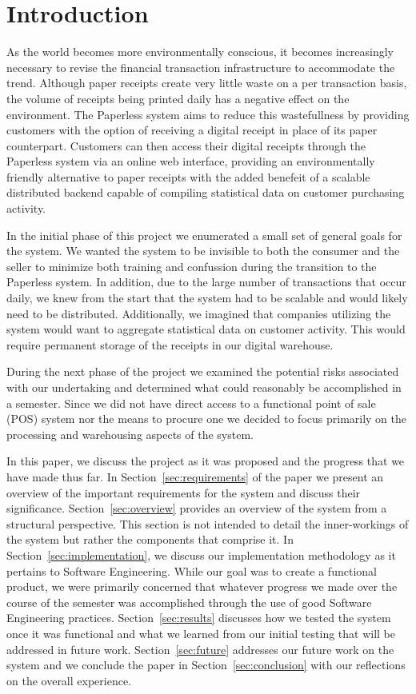 \section{Introduction}
As the world becomes more environmentally conscious, it becomes
increasingly necessary to revise the financial transaction
infrastructure to accommodate the trend.  Although paper receipts
create very little waste on a per transaction basis, the volume of
receipts being printed daily has a negative effect on the environment.
The Paperless system aims to reduce this wastefullness by providing
customers with the option of receiving a digital receipt in place of
its paper counterpart.  Customers can then access their digital
receipts through the Paperless system via an online web interface,
providing an environmentally friendly alternative to paper receipts
with the added benefeit of a scalable distributed backend capable of
compiling statistical data on customer purchasing activity.

In the initial phase of this project we enumerated a small set of
general goals for the system.  We wanted the system to be invisible to
both the consumer and the seller to minimize both training and
confussion during the transition to the Paperless system.  In
addition, due to the large number of transactions that occur daily, we
knew from the start that the system had to be scalable and would
likely need to be distributed.  Additionally, we imagined that
companies utilizing the system would want to aggregate statistical
data on customer activity.  This would require permanent storage of
the receipts in our digital warehouse.

During the next phase of the project we examined the potential risks
associated with our undertaking and determined what could reasonably
be accomplished in a semester.  Since we did not have direct access to
a functional point of sale (POS) system nor the means to procure one
we decided to focus primarily on the processing and warehousing
aspects of the system. 

In this paper, we discuss the project as it was proposed and the
progress that we have made thus far.  In
Section~\ref{sec:requirements} of the paper we present an overview of
the important requirements for the system and discuss their
significance.  Section~\ref{sec:overview} provides an overview of the
system from a structural perspective.  This section is not intended to
detail the inner-workings of the system but rather the components that
comprise it.  In Section~\ref{sec:implementation}, we discuss our
implementation methodology as it pertains to Software Engineering.
While our goal was to create a functional product, we were primarily
concerned that whatever progress we made over the course of the
semester was accomplished through the use of good Software Engineering
practices. Section~\ref{sec:results} discusses how we tested the
system once it was functional and what we learned from our initial
testing that will be addressed in future
work. Section~\ref{sec:future} addresses our future work on the system
and we conclude the paper in Section~\ref{sec:conclusion} with our
reflections on the overall experience.
